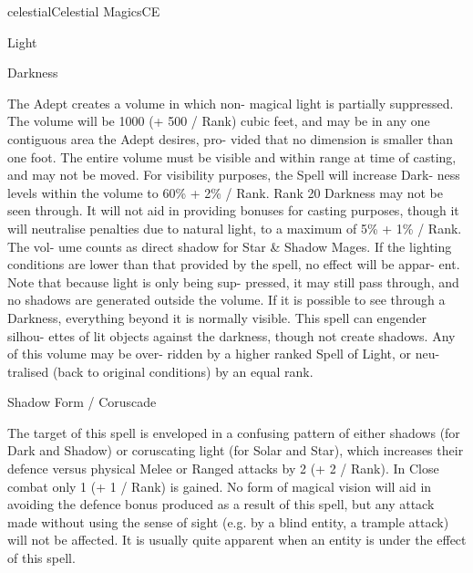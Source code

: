 \begin{College}[1.3]{celestial}{Celestial Magics}{CE}
\begin{spell}[G-2]{Light }
\begin{effects}
\end{effects}
\end{spell}

\begin{spell}[G-3]{Darkness }

\begin{effects}
The Adept creates a volume in which non-
magical  light  is  partially  suppressed.  The  volume 
will be 1000 (+ 500 / Rank) cubic feet, and may be 
in any one contiguous area the Adept desires, pro-
vided  that  no  dimension  is  smaller  than  one  foot. 
The entire volume must be visible and within range 
at  time  of  casting,  and  may  not  be  moved.  For 
visibility  purposes,  the  Spell  will  increase  Dark-
ness levels within the volume to 60\% + 2\% / Rank. 
Rank 20 Darkness may not be seen through. It will 
not  aid  in  providing  bonuses  for  casting  purposes, 
though  it  will  neutralise  penalties  due  to  natural 
light, to a maximum of 5\% + 1\% / Rank. The vol-
ume  counts  as  direct  shadow  for  Star  \&  Shadow 
Mages.  If  the  lighting  conditions  are  lower  than 
that provided by the spell, no effect will be appar-
ent.  Note  that  because  light  is  only  being  sup-
pressed, it may still pass through, and no shadows 
are generated outside the volume. If it is possible to 
see  through  a  Darkness,  everything  beyond  it  is 
normally  visible.  This  spell  can  engender  silhou-
ettes of lit objects against the darkness, though not 
create  shadows.  Any  of  this  volume  may  be  over-
ridden  by  a  higher  ranked  Spell  of  Light,  or  neu-
tralised  (back  to  original  conditions)  by  an  equal 
rank. 
\end{effects}
\end{spell}

\begin{spell}[G-4]{Shadow Form / Coruscade}

\begin{effects}
 The  target  of  this  spell  is  enveloped  in  a 
confusing  pattern  of  either  shadows  (for  Dark  and 
Shadow)  or  coruscating  light  (for  Solar  and  Star), 
which  increases  their  defence  versus  physical 
Melee  or  Ranged  attacks  by  2  (+  2  /  Rank).  In 
Close  combat  only  1  (+  1  /  Rank)  is  gained.  No 
form  of  magical  vision  will  aid  in  avoiding  the 
defence bonus produced as a result of this spell, but 
any  attack  made  without  using  the  sense  of  sight 
(e.g. by a blind entity, a trample attack) will not be 
affected. It is usually quite apparent when an entity 
is under the effect of this spell. 
\end{effects}
\end{spell}



\end{College}
